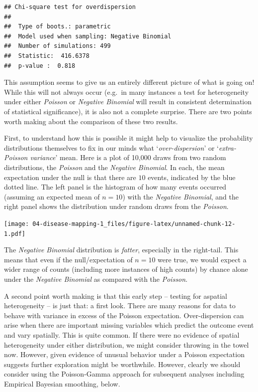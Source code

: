 \documentclass[
]{book}
\begin{document}
\begin{verbatim}
## Chi-square test for overdispersion 
## 
##  Type of boots.: parametric 
##  Model used when sampling: Negative Binomial 
##  Number of simulations: 499 
##  Statistic:  416.6378 
##  p-value :  0.818
\end{verbatim}

This assumption seems to give us an entirely different picture of what is going on! While this will not always occur (e.g.~in many instances a test for heterogeneity under either \emph{Poisson} or \emph{Negative Binomial} will result in consistent determination of statistical significance), it is also not a complete surprise. There are two points worth making about the comparison of these two results.

First, to understand how this is possible it might help to visualize the probability distributions themselves to fix in our minds what `\emph{over-dispersion}' or `\emph{extra-Poisson variance}' mean. Here is a plot of 10,000 draws from two random distributions, the \emph{Poisson} and the \emph{Negative Binomial}. In each, the mean expectation under the null is that there are \(10\) events, indicated by the blue dotted line. The left panel is the histogram of how many events occurred (assuming an expected mean of \(n=10\)) with the \emph{Negative Binomial}, and the right panel shows the distribution under random draws from the \emph{Poisson}.

\texttt{[image: 04-disease-mapping-1\_files/figure-latex/unnamed-chunk-12-1.pdf]}

The \emph{Negative Binomial} distribution is \emph{fatter}, especially in the right-tail. This means that even if the null/expectation of \(n=10\) were true, we would expect a wider range of counts (including more instances of high counts) by chance alone under the \emph{Negative Binomial} as compared with the \emph{Poisson}.

A second point worth making is that this early step -- testing for aspatial heterogeneity -- is just that: a first look. There are many reasons for data to behave with variance in excess of the Poisson expectation. Over-dispersion can arise when there are important missing variables which predict the outcome event and vary spatially. This is quite common. If there were no evidence of spatial heterogeneity under either distribution, we might consider throwing in the towel now. However, given evidence of unusual behavior under a Poisson expectation suggests further exploration might be worthwhile. However, clearly we should consider using the Poisson-Gamma approach for subsequent analyses including Empirical Bayesian smoothing, below.
\end{document}
